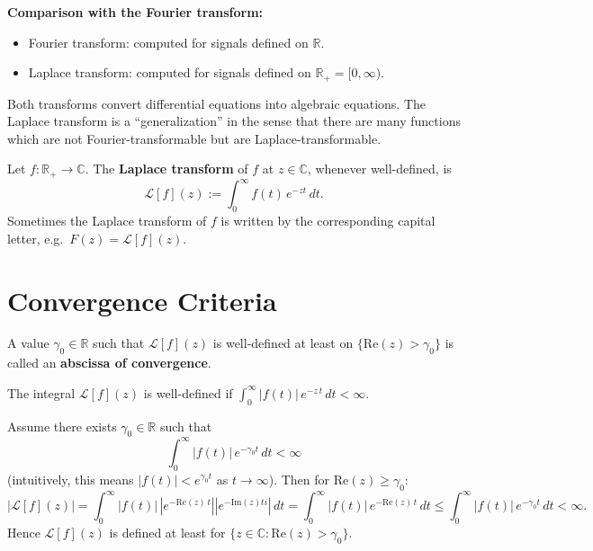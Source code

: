 \textbf{Comparison with the Fourier transform:}
\begin{itemize}
  \item Fourier transform: computed for signals defined on $\mathbb{R}$.
  \item Laplace transform: computed for signals defined on $\mathbb{R}_+ = [0, \infty)$.
\end{itemize}
Both transforms convert differential equations into algebraic equations. The Laplace transform is a ``generalization'' in the sense that there are many functions which are not Fourier-transformable but are Laplace-transformable.

\begin{definition}
Let $f : \mathbb{R}_+ \to \mathbb{C}$. The \textbf{Laplace transform} of $f$ at $z \in \mathbb{C}$, whenever well-defined, is
\[
\mathcal{L}[f](z) := \int_0^{\infty} f(t)\, e^{-zt}\, dt.
\]
Sometimes the Laplace transform of $f$ is written by the corresponding capital letter, e.g.\ $F(z) = \mathcal{L}[f](z)$.
\end{definition}

\section{Convergence Criteria}

\begin{definition}
A value $\gamma_0 \in \mathbb{R}$ such that $\mathcal{L}[f](z)$ is well-defined at least on $\{\mathrm{Re}(z) > \gamma_0\}$ is called an \textbf{abscissa of convergence}.
\end{definition}

The integral $\mathcal{L}[f](z)$ is well-defined if $\displaystyle\int_0^{\infty} |f(t)|\, e^{-z\, t}\, dt < \infty$.

\begin{theorem}
Assume there exists $\gamma_0 \in \mathbb{R}$ such that
\[
\int_0^{\infty} |f(t)|\, e^{-\gamma_0 t}\, dt < \infty
\]
(intuitively, this means $|f(t)| < e^{\gamma_0 t}$ as $t \to \infty$). Then for $\mathrm{Re}(z) \geq \gamma_0$:
\[
|\mathcal{L}[f](z)|
= \int_0^{\infty} |f(t)|\, |e^{-\mathrm{Re}(z)\,t}| |e^{- \mathrm{Im}(z)ti}| \, dt =  \int_0^{\infty} |f(t)|\, e^{-\mathrm{Re}(z)\,t}\, dt 
\leq \int_0^{\infty} |f(t)|\, e^{-\gamma_0 t}\, dt < \infty.
\]
Hence $\mathcal{L}[f](z)$ is defined at least for $ \{z \in \mathbb{C} : \mathrm{Re}(z) > \gamma_0\}$.
\end{theorem}

